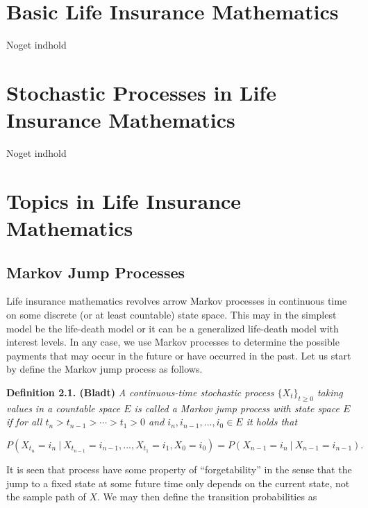 \documentclass[
]{book}
\begin{document}
\hypertarget{basic-life-insurance-mathematics}{%
\chapter{Basic Life Insurance Mathematics}\label{basic-life-insurance-mathematics}}

Noget indhold

\hypertarget{stochastic-processes-in-life-insurance-mathematics}{%
\chapter{Stochastic Processes in Life Insurance Mathematics}\label{stochastic-processes-in-life-insurance-mathematics}}

Noget indhold

\hypertarget{topics-in-life-insurance-mathematics}{%
\chapter{Topics in Life Insurance Mathematics}\label{topics-in-life-insurance-mathematics}}

\hypertarget{markov-jump-processes}{%
\section{Markov Jump Processes}\label{markov-jump-processes}}

Life insurance mathematics revolves arrow Markov processes in continuous time on some discrete (or at least countable) state space. This may in the simplest model be the life-death model or it can be a generalized life-death model with interest levels. In any case, we use Markov processes to determine the possible payments that may occur in the future or have occurred in the past. Let us start by define the Markov jump process as follows.

\textbf{Definition 2.1. (Bladt)} \emph{A continuous-time stochastic process \(\{X_t\}_{t\ge 0}\) taking values in a countable space \(E\) is called a Markov jump process with state space \(E\) if for all \(t_n>t_{n-1}>\cdots > t_1>0\) and \(i_n,i_{n-1},...,i_0\in E\) it holds that}

\[
P(X_{t_n}=i_n \ \vert\ X_{t_{n-1}}=i_{n-1},...,X_{t_1}=i_1,X_0=i_0)=P(X_{n-1}=i_n\ \vert\ X_{n-1}=i_{n-1}).
\]

It is seen that process have some property of ``forgetability'' in the sense that the jump to a fixed state at some future time only depends on the current state, not the sample path of \(X\). We may then define the transition probabilities as
\end{document}
